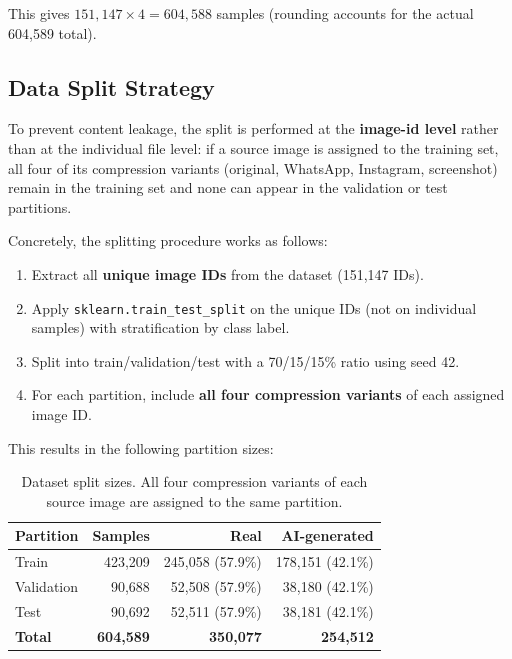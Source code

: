 This gives $151{,}147 \times 4 = 604{,}588$ samples (rounding accounts for the actual 604,589 total).

\subsection{Data Split Strategy}\label{sec:split}

To prevent content leakage, the split is performed at the \textbf{image-id level} rather than at the individual file level: if a source image is assigned to the training set, all four of its compression variants (original, WhatsApp, Instagram, screenshot) remain in the training set and none can appear in the validation or test partitions.

Concretely, the splitting procedure works as follows:
\begin{enumerate}
    \item Extract all \textbf{unique image IDs} from the dataset (151,147 IDs).
    \item Apply \texttt{sklearn.train\_test\_split} on the unique IDs (not on individual samples) with stratification by class label.
    \item Split into train/validation/test with a 70/15/15\% ratio using seed 42.
    \item For each partition, include \textbf{all four compression variants} of each assigned image ID.
\end{enumerate}

This results in the following partition sizes:

\begin{table}[htbp]
    \centering
    \caption{Dataset split sizes. All four compression variants of each source image are assigned to the same partition.}
    \label{tab:split}
    \begin{tabular}{@{}lrrr@{}}
    \toprule
    \textbf{Partition} & \textbf{Samples} & \textbf{Real} & \textbf{AI-generated} \\
    \midrule
    Train      & 423,209 & 245,058 (57.9\%) & 178,151 (42.1\%) \\
    Validation &  90,688 &  52,508 (57.9\%) &  38,180 (42.1\%) \\
    Test       &  90,692 &  52,511 (57.9\%) &  38,181 (42.1\%) \\
    \midrule
    \textbf{Total} & \textbf{604,589} & \textbf{350,077} & \textbf{254,512} \\
    \bottomrule
    \end{tabular}
\end{table}

